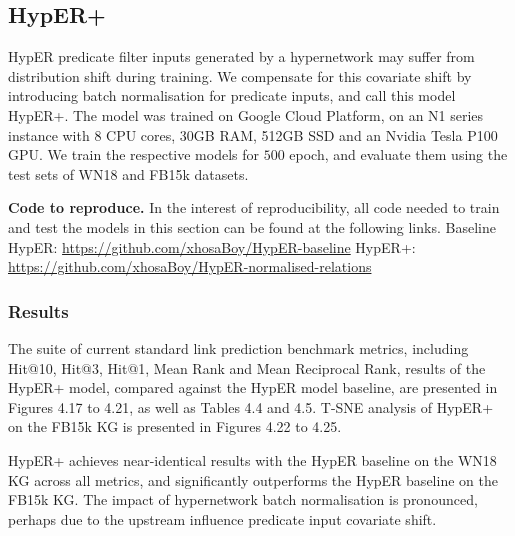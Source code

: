 
\subsection{HypER+}
HypER predicate filter inputs generated by a hypernetwork may suffer from distribution shift during training. We compensate for this covariate shift by introducing batch normalisation for predicate inputs, and call this model HypER+. The model was trained on Google Cloud Platform, on an N1 series instance with  8 CPU cores, 30GB RAM, 512GB SSD and an Nvidia Tesla P100 GPU. We train the respective models for $ 500 $ epoch, and evaluate them using the test sets of WN18 and FB15k datasets. \par

\noindent \textbf{Code to reproduce.} In the interest of reproducibility, all code needed to train and test the models in this section can be found at the following links. \newline
Baseline HypER: \url{https://github.com/xhosaBoy/HypER-baseline} \newline
HypER+: \url{https://github.com/xhosaBoy/HypER-normalised-relations} 

\subsubsection{Results}
The suite of current standard link prediction benchmark metrics, including Hit@10, Hit@3, Hit@1, Mean Rank and Mean Reciprocal Rank, results of the HypER+ model, compared against the HypER model baseline, are presented in Figures 4.17 to 4.21, as well as Tables 4.4 and 4.5. T-SNE analysis of HypER+ on the FB15k KG is presented in Figures 4.22 to 4.25. \par

\noindent HypER+ achieves near-identical results with the HypER baseline on the WN18 KG across all metrics, and significantly outperforms the HypER baseline on the FB15k KG. The impact of hypernetwork batch normalisation is pronounced, perhaps due to the upstream influence predicate input covariate shift. 

\bigskip
\bigskip



